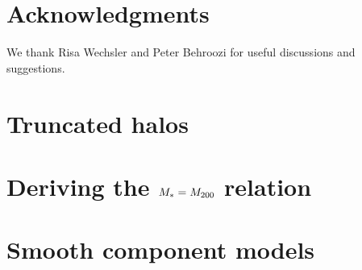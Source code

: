 \documentclass[useAMS,usenatbib]{mn2e}
\begin{document}




\section*{Acknowledgments}
 
We thank Risa Wechsler and Peter Behroozi for useful discussions and 
suggestions.



\appendix

\section{Truncated \LCDM halos}
\label{appendix:halos}

\section{Deriving the $M_{*}=M_{\rm 200}$ relation}
\label{appendix:MSMH}

\section{Smooth component models}
\label{appendix:smooth}





% 





\label{lastpage}
\bsp
\end{document}
